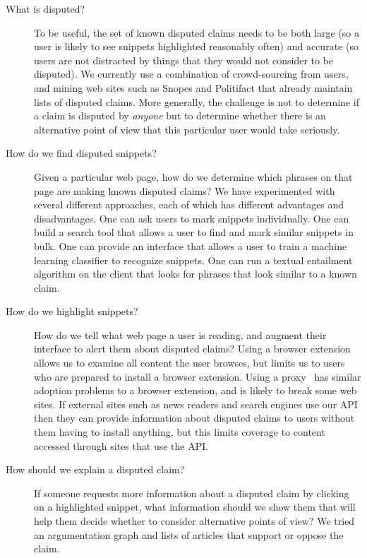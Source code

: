 \documentclass{www2010-submission}
\begin{document}
\begin{description}
\item[What is disputed?] To be useful, the set of known disputed claims needs to be both large (so a user is likely to see snippets highlighted reasonably often) and accurate (so users are not distracted by things that they would not consider to be disputed). We currently use a combination of crowd-sourcing from users, and mining web sites such as Snopes and Politifact that already maintain lists of disputed claims. More generally, the challenge is not to determine if a claim is disputed by {\it anyone} but to determine whether there is an alternative point of view that this particular user would take seriously.

\item[How do we find disputed snippets?] Given a particular web page, how do we determine which phrases on that page are making known disputed claims? We have experimented with several different approaches, each of which has different advantages and disadvantages. One can ask users to mark snippets individually. One can build a search tool that allows a user to find and mark similar snippets in bulk. One can provide an interface that allows a user to train a machine learning classifier to recognize snippets. One can run a textual entailment algorithm on the client that looks for phrases that look similar to a known claim. 

\item[How do we highlight snippets?] How do we tell what web page a user is reading, and augment their interface to alert them about disputed claims? Using a browser extension allows us to examine all content the user browses, but limits us to users who are prepared to install a browser extension. Using a proxy~\cite{Barrett1997} has similar adoption problems to a browser extension, and is likely to break some web sites. If external sites such as news readers and search engines use our API then they can provide information about disputed claims to users without them having to install anything, but this limits coverage to content accessed through sites that use the API.

\item[How should we explain a disputed claim?] If someone requests more information about a disputed claim by clicking on a highlighted snippet, what information should we show them that will help them decide whether to consider alternative points of view? We tried an argumentation graph and lists of articles that support or oppose the claim.
\end{description}
\end{document}

